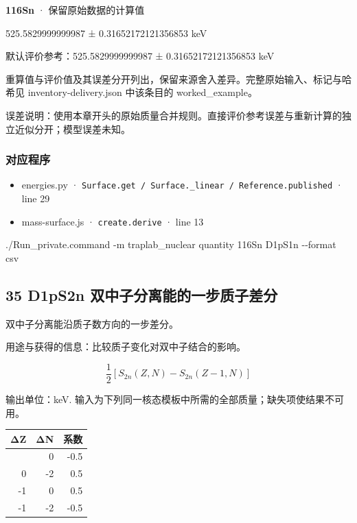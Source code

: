 \documentclass[
  11pt,
  letterpaper,
]{article}
\newenvironment{Shaded}{}{}
\newcommand{\AttributeTok}[1]{\textcolor[rgb]{0.49,0.56,0.16}{#1}}
\newcommand{\ExtensionTok}[1]{#1}
\newcommand{\NormalTok}[1]{#1}
\providecommand{\tightlist}{%
  \setlength{\itemsep}{0pt}\setlength{\parskip}{0pt}}
\begin{document}
\textbf{116Sn} · 保留原始数据的计算值

525.5829999999987 ± 0.31652172121356853 keV

默认评价参考：525.5829999999987 ± 0.31652172121356853 keV

重算值与评价值及其误差分开列出，保留来源舍入差异。完整原始输入、标记与哈希见
inventory-delivery.json 中该条目的 worked\_example。

误差说明：使用本章开头的原始质量合并规则。直接评价参考误差与重新计算的独立近似分开；模型误差未知。

\subsubsection{对应程序}\label{ux5bf9ux5e94ux7a0bux5e8f-33}

\begin{itemize}
\tightlist
\item
  energies.py ·
  \texttt{Surface.get\ /\ Surface.\_linear\ /\ Reference.published} ·
  line 29
\item
  mass-surface.js · \texttt{create.derive} · line 13
\end{itemize}

\begin{Shaded}
\begin{Highlighting}[]
\ExtensionTok{./Run\_private.command} \AttributeTok{{-}m}\NormalTok{ traplab\_nuclear quantity 116Sn D1pS1n }\AttributeTok{{-}{-}format}\NormalTok{ csv}
\end{Highlighting}
\end{Shaded}

\subsection{35 D1pS2n
双中子分离能的一步质子差分}\label{d1ps2n-ux53ccux4e2dux5b50ux5206ux79bbux80fdux7684ux4e00ux6b65ux8d28ux5b50ux5deeux5206}

双中子分离能沿质子数方向的一步差分。

用途与获得的信息：比较质子变化对双中子结合的影响。

\[
\frac12[S_{2n}(Z,N)-S_{2n}(Z-1,N)]
\]

输出单位：keV.
输入为下列同一核态模板中所需的全部质量；缺失项使结果不可用。

\begin{longtable}[]{@{}rrr@{}}
\toprule\noalign{}
ΔZ & ΔN & 系数 \\
\midrule\noalign{}
\endhead
\bottomrule\noalign{}
\endlastfoot
0 & 0 & -0.5 \\
0 & -2 & 0.5 \\
-1 & 0 & 0.5 \\
-1 & -2 & -0.5 \\
\end{longtable}
\end{document}
